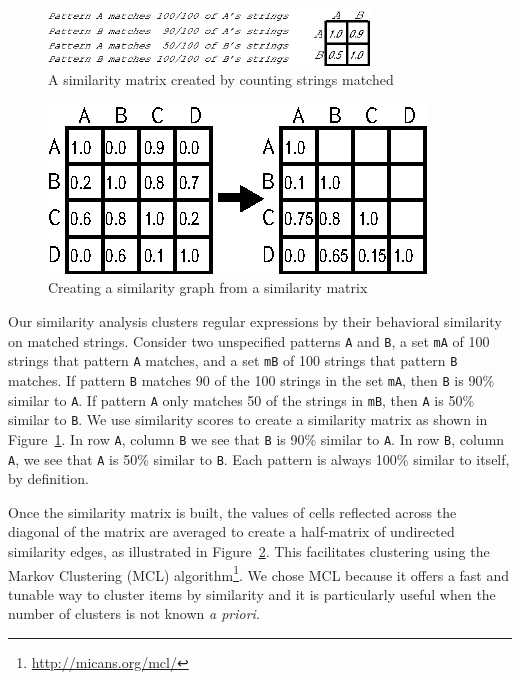 \begin{figure}[tb]
\centering
\includegraphics[height=0.6in]{nontex/minimalMatrix.eps}
\caption{A similarity matrix created by counting strings matched}
\label{fig:minimalMatrix}
\end{figure}

\begin{figure}[tb]
\centering
\includegraphics[width=0.7\columnwidth]{nontex/matrixToGraph.eps}
\vspace{-6pt}
\caption{Creating a similarity graph from a similarity matrix}
\vspace{-6pt}
\label{fig:matrixToGraph}
\end{figure}

Our similarity analysis clusters regular expressions by their behavioral similarity on matched strings.
Consider two unspecified patterns {\tt A} and {\tt B}, a set {\tt mA} of 100 strings that pattern {\tt A} matches, and a set {\tt mB} of 100 strings that pattern {\tt B} matches.
If pattern {\tt B} matches 90 of the 100 strings in the set {\tt mA}, then {\tt B} is 90\% similar to {\tt A}.
If pattern {\tt A} only matches 50 of the strings in {\tt mB}, then {\tt A} is 50\% similar to {\tt B}.
We use similarity scores to create a similarity matrix as shown in Figure~\ref{fig:minimalMatrix}.
In row {\tt A}, column {\tt B} we see that {\tt B} is 90\% similar to {\tt A}.
In row {\tt B}, column {\tt A}, we see that {\tt A} is 50\% similar to {\tt B}.  Each pattern is always 100\% similar to itself, by definition.

Once the similarity matrix is built, the values of cells reflected across the diagonal of the matrix are averaged to create a half-matrix of undirected similarity edges, as illustrated in Figure~\ref{fig:matrixToGraph}.
This facilitates clustering using the  Markov Clustering (MCL) algorithm\footnote{\url{http://micans.org/mcl/}}.
We chose MCL  because it offers a fast and tunable way to cluster items by similarity and it is particularly useful when the number of clusters is not known \emph{a priori}.

